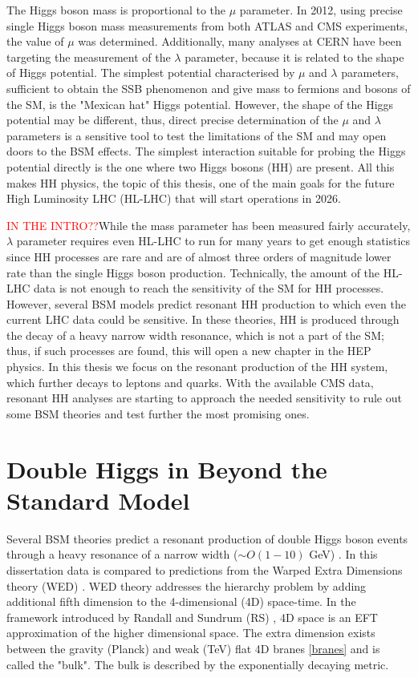 The Higgs boson mass is proportional to the $\mu$ parameter. In 2012, using precise single Higgs boson mass measurements from both ATLAS and CMS experiments, the value of $\mu$ was determined. Additionally, many analyses at CERN have been targeting the measurement of the $\lambda$ parameter, because it is related to the shape of Higgs potential. The simplest potential characterised by $\mu$ and $\lambda$ parameters, sufficient to obtain the SSB phenomenon and give mass to fermions and bosons of the SM, is the "Mexican hat" Higgs potential. However, the shape of the Higgs potential may be different, thus, direct precise determination of the $\mu$ and $\lambda$ parameters is a sensitive tool to test the limitations of the SM and may open doors to the BSM effects. The simplest interaction suitable for probing the Higgs potential directly is the one where two Higgs bosons (HH) are present. All this makes HH physics, the topic of this thesis, one of the main goals for the future High Luminosity LHC (HL-LHC) that will start operations in 2026. 


\textcolor{red}{IN THE INTRO??}While the mass parameter has been measured fairly accurately, $\lambda$ parameter requires even HL-LHC to run for many years to get enough statistics since HH processes are rare and are of almost three orders of magnitude lower rate than the single Higgs boson production. Technically, the amount of the HL-LHC data is not enough to reach the sensitivity of the SM for HH processes. However, several BSM models predict resonant HH production to which even the current LHC data could be sensitive. In these theories, HH is produced through the decay of a heavy narrow width resonance, which is not a part of the SM; thus, if such processes are found, this will open a new chapter in the HEP physics. In this thesis we focus on the resonant production of the HH system, which further decays to leptons and quarks. With the available CMS data, resonant HH analyses are starting to approach the needed sensitivity to rule out some BSM theories and test further the most promising ones.

\section{Double Higgs in Beyond the Standard Model}

Several BSM theories \cite{Huang:2017nnw, Dolan:2012ac, Kanemura:2016tan} predict a resonant production of double Higgs boson events through a heavy resonance of a narrow width ($\sim O(1-10)$ GeV) \cite{Sirunyan:2018iwt}. In this dissertation data is compared to predictions from the Warped Extra Dimensions theory (WED) \cite{Oliveira:2014kla}. WED theory addresses the hierarchy problem by adding additional fifth dimension to the 4-dimensional (4D) space-time. In the framework introduced by Randall and Sundrum (RS) \cite{Randall:1999ee}, 4D space is an EFT approximation of the higher dimensional space. The extra dimension exists between the gravity (Planck) and weak (TeV) flat 4D branes \ref{branes} and is called the "bulk". The bulk is described by the exponentially decaying metric. 



